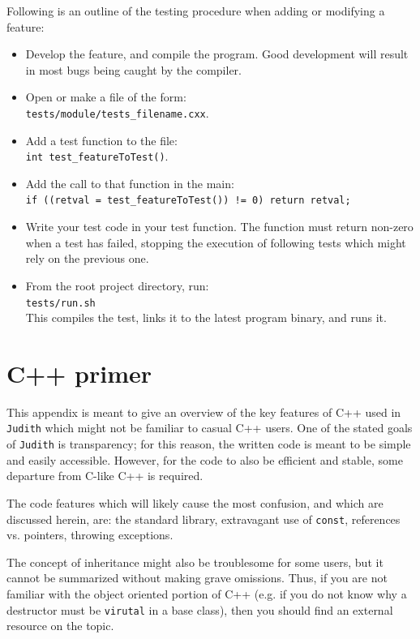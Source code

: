 \documentclass[10pt,a4paper]{book}
\newcommand{\Judith}{\Verb`Judith` }
\begin{document}
Following is an outline of the testing procedure when adding or modifying a feature:

\begin{itemize}
	\item Develop the feature, and compile the program. Good development will result in most bugs being caught by the compiler.
	\item Open or make a file of the form: \\
	      \Verb`tests/module/tests_filename.cxx`.
	\item Add a test function to the file:\\
		  \Verb`int test_featureToTest()`.
	\item Add the call to that function in the main:\\
		  \Verb`if ((retval = test_featureToTest()) != 0) return retval;`
	\item Write your test code in your test function. The function must return non-zero when a test has failed, stopping the execution of following tests which might rely on the previous one.
	\item From the root project directory, run:\\
		  \Verb`tests/run.sh` \\
		  This compiles the test, links it to the latest program binary, and runs it.
\end{itemize}

\appendix

\chapter{C++ primer}
\label{ch:cppprimer}

This appendix is meant to give an overview of the key features of C++ used in \Judith which might not be familiar to casual C++ users. One of the stated goals of \Judith is transparency; for this reason, the written code is meant to be simple and easily accessible. However, for the code to also be efficient and stable, some departure from C-like C++ is required.

The code features which will likely cause the most confusion, and which are discussed herein, are: the standard library, extravagant use of \Verb`const`, references vs. pointers, throwing exceptions.

The concept of inheritance might also be troublesome for some users, but it cannot be summarized without making grave omissions. Thus, if you are not familiar with the object oriented portion of C++ (e.g. if you do not know why a destructor must be \Verb`virutal` in a base class), then you should find an external resource on the topic.
\end{document}
